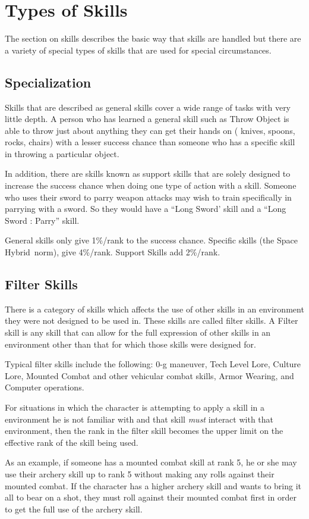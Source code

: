 \section{Types of Skills}

The section on skills describes the basic way that skills are 
handled but there are a variety of special types of skills that are 
used for special circumstances.

\subsection{Specialization}

Skills that are described as general skills cover a wide range of 
tasks with very little depth. A person who has learned a general 
skill such as Throw Object is able to throw just about anything they 
can get their hands on ( knives, spoons, rocks, chairs) with a lesser 
success chance than someone who has a specific skill in throwing a
particular object.

In addition, there are skills known as support skills that are solely 
designed to increase the success chance when doing one type of action 
with a skill. Someone who uses their sword to parry weapon attacks 
may wish to train specifically in parrying with a sword. So they 
would have a ``Long Sword' skill and a ``Long Sword : Parry'' skill.


General skills only give 1\%/rank to the success chance. Specific 
skills (the Space Hybrid\ norm), give 4\%/rank. Support Skills add 2\%/rank.

\subsection{Filter Skills}

There is a category of skills which affects the use of other skills 
in an environment they were not designed to be used in. These skills 
are called filter skills. A Filter skill is any skill that can allow 
for the full expression of other skills in an environment other than 
that for which those skills were designed for.

Typical filter skills include the following: 0-g maneuver, Tech 
Level Lore, Culture Lore, Mounted Combat and other vehicular combat 
skills, Armor Wearing, and Computer operations.

For situations in which the character is attempting to apply a skill 
in a environment he is not familiar with and that skill {\em must }
interact with that environment, then the rank in the filter skill 
becomes the upper limit on the effective rank of the skill being 
used.

As an example, if someone has a mounted combat skill at rank 5, he or she
may use their archery skill up to rank 5 without making any rolls
against their mounted combat. If the character has a higher archery skill
and wants to bring it all to bear on a shot, they must roll against
their mounted combat first in order to get the full use of the archery
skill.

